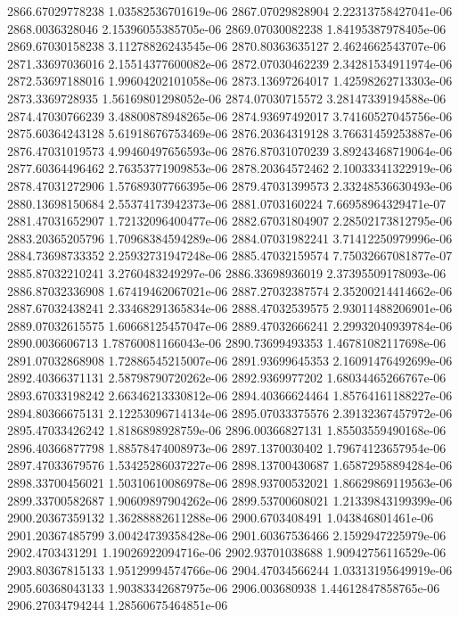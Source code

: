 {2866.67029778238 1.03582536701619e-06
2867.07029828904 2.22313758427041e-06
2868.0036328046 2.15396055385705e-06
2869.07030082238 1.84195387978405e-06
2869.67030158238 3.11278826243545e-06
2870.80363635127 2.4624662543707e-06
2871.33697036016 2.15514377600082e-06
2872.07030462239 2.34281534911974e-06
2872.53697188016 1.99604202101058e-06
2873.13697264017 1.42598262713303e-06
2873.3369728935 1.56169801298052e-06
2874.07030715572 3.28147339194588e-06
2874.47030766239 3.48800878948265e-06
2874.93697492017 3.74160527045756e-06
2875.60364243128 5.61918676753469e-06
2876.20364319128 3.76631459253887e-06
2876.47031019573 4.99460497656593e-06
2876.87031070239 3.89243468719064e-06
2877.60364496462 2.76353771909853e-06
2878.20364572462 2.10033341322919e-06
2878.47031272906 1.57689307766395e-06
2879.47031399573 2.33248536630493e-06
2880.13698150684 2.55374173942373e-06
2881.0703160224 7.66958964329471e-07
2881.47031652907 1.72132096400477e-06
2882.67031804907 2.28502173812795e-06
2883.20365205796 1.70968384594289e-06
2884.07031982241 3.71412250979996e-06
2884.73698733352 2.25932731947248e-06
2885.47032159574 7.75032667081877e-07
2885.87032210241 3.2760483249297e-06
2886.33698936019 2.37395509178093e-06
2886.87032336908 1.67419462067021e-06
2887.27032387574 2.35200214414662e-06
2887.67032438241 2.33468291365834e-06
2888.47032539575 2.93011488206901e-06
2889.07032615575 1.60668125457047e-06
2889.47032666241 2.29932040939784e-06
2890.0036606713 1.78760081166043e-06
2890.73699493353 1.46781082117698e-06
2891.07032868908 1.72886545215007e-06
2891.93699645353 2.16091476492699e-06
2892.40366371131 2.58798790720262e-06
2892.9369977202 1.68034465266767e-06
2893.67033198242 2.66346213330812e-06
2894.40366624464 1.85764161188227e-06
2894.80366675131 2.12253096714134e-06
2895.07033375576 2.39132367457972e-06
2895.47033426242 1.8186898928759e-06
2896.00366827131 1.85503559490168e-06
2896.40366877798 1.88578474008973e-06
2897.1370030402 1.79674123657954e-06
2897.47033679576 1.53425286037227e-06
2898.13700430687 1.65872958894284e-06
2898.33700456021 1.50310610086978e-06
2898.93700532021 1.86629869119563e-06
2899.33700582687 1.90609897904262e-06
2899.53700608021 1.21339843199399e-06
2900.20367359132 1.36288882611288e-06
2900.6703408491 1.043846801461e-06
2901.20367485799 3.00424739358428e-06
2901.60367536466 2.1592947225979e-06
2902.4703431291 1.19026922094716e-06
2902.93701038688 1.90942756116529e-06
2903.80367815133 1.95129994574766e-06
2904.47034566244 1.03313195649919e-06
2905.60368043133 1.90383342687975e-06
2906.003680938 1.44612847858765e-06
2906.27034794244 1.28560675464851e-06
}
